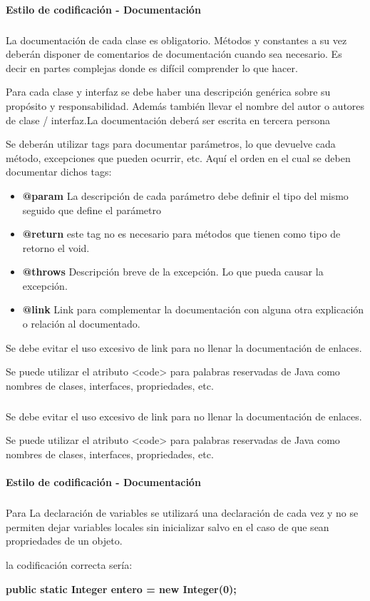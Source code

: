 \paragraph{Estilo de codificación - Documentación}
\subparagraph{}
La documentación de cada clase es obligatorio. Métodos y constantes a su vez deberán disponer de comentarios de documentación cuando sea necesario. Es decir en partes complejas donde es difícil comprender lo que hacer.

Para cada clase y interfaz se debe haber una descripción genérica sobre su propósito y responsabilidad. Además también llevar el nombre del autor o autores de clase / interfaz.La documentación deberá ser escrita en tercera persona

Se deberán utilizar tags  para documentar parámetros, lo que devuelve cada método, excepciones que pueden ocurrir, etc. Aquí el orden en el cual se deben documentar dichos tags:

\begin{itemize}
\item \textbf{@param }
  La descripción de cada parámetro debe definir el tipo del mismo seguido que define el parámetro
\item \textbf{@return }
  este tag no es necesario para métodos que tienen como tipo de retorno el void.
\item \textbf{@throws }
  Descripción breve de la excepción. Lo que pueda causar la excepción.
\item \textbf{@link }
  Link para complementar la documentación con alguna otra explicación o relación al documentado. 
\end{itemize}

Se debe evitar el uso excesivo de link para no llenar la documentación de enlaces.

Se puede utilizar el atributo <code> para palabras reservadas de Java como nombres de clases, interfaces, propriedades, etc.


\subparagraph{}
Se debe evitar el uso excesivo de link para no llenar la documentación de enlaces.

Se puede utilizar el atributo <code> para palabras reservadas de Java como nombres de clases, interfaces, propriedades, etc.

\paragraph{Estilo de codificación - Documentación}
\subparagraph{}
Para La declaración de variables se utilizará una declaración de cada vez y no se permiten dejar variables locales sin inicializar salvo en el caso de que sean propriedades de un objeto.

la codificación correcta sería:

\textbf{public static Integer entero = new Integer(0);}
